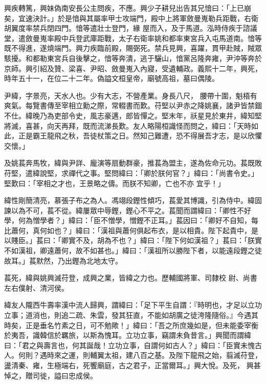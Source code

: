 \begin{pinyinscope}
 興疾轉篤，興妹偽南安長公主問疾，不應。興少子耕兒出告其兄愔曰：「上已崩矣，宜速決計。」於是愔與其屬率甲士攻端門，殿中上將軍斂曼嵬勒兵距戰，右衛胡翼度率禁兵閉四門。愔等遣壯士登門，緣
 屋而入，及于馬道。泓時侍疾于諮議堂，遣斂曼嵬率殿中兵登武庫距戰，太子右衛率姚和都率東宮兵入屯馬道南。愔等既不得進，遂燒端門。興力疾臨前殿，賜弼死。禁兵見興，喜躍，貫甲赴賊，賊眾駭擾。和都勒東宮兵自後擊之，愔等奔潰，逃于驪山，愔黨呂隆奔雍，尹沖等奔於京師。興引紹及贊、梁喜、尹昭、斂曼嵬入內寢，受遺輔政。義熙十二年，興死，時年五十一，在位二十二年。偽謚文桓皇帝，廟號高祖，墓曰偶陵。



 尹緯，字景亮，天水人也。少有大志，不營產業。身長八尺，
 腰帶十圍，魁梧有爽氣。每覽書傳至宰相立勳之際，常輟書而歎。苻堅以尹赤之降姚襄，諸尹皆禁錮不仕。緯晚乃為吏部令史，風志豪邁，郎皆憚之。堅末年，祅星見於東井，緯知堅將滅，喜甚，向天再拜，既而流涕長歎。友人略陽桓識怪而問之，緯曰：「天時如此，正是霸王龍飛之秋，吾徒杖策之日。然知己難遭，恐不得展吾才志，是以欣懼交懷。」



 及姚萇奔馬牧，緯與尹詳、龐演等扇動群豪，推萇為盟主，遂為佐命元功。萇既敗苻堅，遣緯說堅，求禪代之事。堅問緯曰：「卿於朕何官？」緯曰：「尚書令史。」堅歎曰：「宰相之才也，王景略之儔。而朕不知卿，亡也不亦
 宜乎！」



 緯性剛簡清亮，慕張子布之為人。馮翊段鏗性傾巧，萇愛其博識，引為侍中。緯固諫以為不可，萇不從。緯屢眾中辱鏗，鏗心不平之。萇聞而謂緯曰：「卿性不好學，何為憎學者？」緯曰：「臣不憎學，憎鏗不正耳。」萇因曰：「卿好不自知，每比蕭何，真何如也？」緯曰：「漢祖與蕭何俱起布衣，是以相貴。陛下起貴中，是以賤臣。」萇曰：「卿實不及，胡為不也？」緯曰：「陛下何如漢祖？」萇曰：「朕實不如漢祖，卿遠蕭何，故不如甚也。」緯曰：「漢祖所以勝陛下者，以能遠段鏗之徒故耳。」萇默然，乃出鏗為北地太守。



 萇死，緯與姚興滅苻登，成興之業，皆緯之力也。歷輔國將軍、司隸校
 尉、尚書左右僕射、清河侯。



 緯友人隴西牛壽率漢中流人歸興，謂緯曰：「足下平生自謂：『時明也，才足以立功立事；道消也，則追二疏、朱雲，發其狂直，不能如胡廣之徒洿隆隨俗。』今遇其時矣，正是垂名竹素之日，可不勉歟！」緯曰：「吾之所庶幾如是，但未能委宰衡於夷吾，識韓信於羈旅，以斯為愧耳。立功立事，竊謂未負昔言。」興聞而謂緯曰：「君之與壽言也，何其誕哉！立功立事，自謂何如古人？」緯曰：「臣實未愧古人。何則？遇時來之運，則輔翼太祖，建八百之基。及陛下龍飛之始，翦滅苻登，盪清秦、雍，生極端右，死饗廟庭，古之君子，正當爾耳。」興大悅。及死，
 興甚悼之，贈司徙，謚曰忠成侯。



\end{pinyinscope}